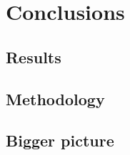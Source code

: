 \chapter{Conclusions}\label{cha:conclusions}


\section{Results}\label{sec:conclusions:results}


\section{Methodology}\label{sec:conclusions:method}


\section{Bigger picture}\label{sec:conclusions:big}


